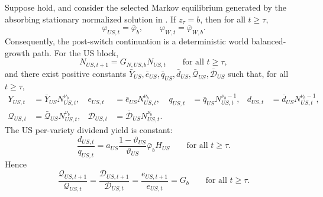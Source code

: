 \documentclass{article}
\begin{document}
\begin{prop}\label{prop_balanced_growth_primitives}
Suppose  hold, and consider the selected Markov equilibrium generated by the absorbing stationary normalized solution in . If $z_\tau=b$, then for all $t\ge \tau$,
\[
\varphi_{US,t}=\bar\varphi_b,
\qquad
\varphi_{W,t}=\bar\varphi_{W,b}.
\]
Consequently, the post-switch continuation is a deterministic world balanced-growth path. For the US block,
\begin{equation}\label{bg_us_knowledge_growth}
N_{US,t+1}=G_{N,US,b}N_{US,t}
\qquad\text{for all }t\ge \tau,
\end{equation}
and there exist positive constants
$\bar Y_{US},\bar e_{US},\bar q_{US},\bar d_{US},\bar{\mathcal Q}_{US},\bar{\mathcal D}_{US}$
such that, for all $t\ge\tau$,
\begin{align}
Y_{US,t}&=\bar Y_{US}N_{US,t}^{\nu_b},
&
e_{US,t}&=\bar e_{US}N_{US,t}^{\nu_b},
&
q_{US,t}&=\bar q_{US}N_{US,t}^{\nu_b-1},
&
d_{US,t}&=\bar d_{US}N_{US,t}^{\nu_b-1},
\label{bg_us_per_variety_scaling}\\
\mathcal Q_{US,t}&=\bar{\mathcal Q}_{US}N_{US,t}^{\nu_b},
&
\mathcal D_{US,t}&=\bar{\mathcal D}_{US}N_{US,t}^{\nu_b}.
\label{bg_us_scaling}
\end{align}
The US per-variety dividend yield is constant:
\begin{equation}\label{bg_us_dividend_yield}
\frac{d_{US,t}}{q_{US,t}}
=
a_{US}\frac{1-\vartheta_{US}}{\vartheta_{US}}\bar\varphi_b H_{US}
\qquad\text{for all }t\ge \tau.
\end{equation}
Hence
\begin{equation}\label{bg_us_growth_rate}
\frac{\mathcal Q_{US,t+1}}{\mathcal Q_{US,t}}
=
\frac{\mathcal D_{US,t+1}}{\mathcal D_{US,t}}
=
\frac{e_{US,t+1}}{e_{US,t}}
=
G_b
\qquad\text{for all }t\ge \tau.
\end{equation}


\end{prop}
\end{document}
